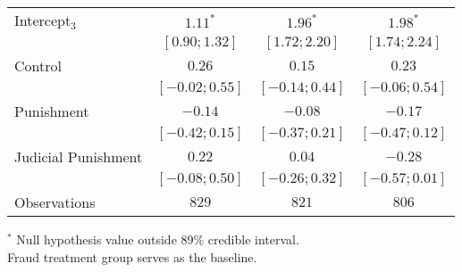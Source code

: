 \begin{table}[h]
\begin{center}
\begin{threeparttable}
\begin{tabular}{l c c c}
Intercept$_3$       & $1.11^{*}$        & $1.96^{*}$        & $1.98^{*}$        \\
                    & $ [ 0.90;  1.32]$ & $ [ 1.72;  2.20]$ & $ [ 1.74;  2.24]$ \\
Control             & $0.26$            & $0.15$            & $0.23$            \\
                    & $ [-0.02;  0.55]$ & $ [-0.14;  0.44]$ & $ [-0.06;  0.54]$ \\
Punishment          & $-0.14$           & $-0.08$           & $-0.17$           \\
                    & $ [-0.42;  0.15]$ & $ [-0.37;  0.21]$ & $ [-0.47;  0.12]$ \\
Judicial Punishment & $0.22$            & $0.04$            & $-0.28$           \\
                    & $ [-0.08;  0.50]$ & $ [-0.26;  0.32]$ & $ [-0.57;  0.01]$ \\
\hline
Observations        & $829$             & $821$             & $806$             \\
\hline
\end{tabular}
\begin{tablenotes}[flushleft]
\scriptsize{$^*$ Null hypothesis value outside 89\% credible interval.  \\
Fraud treatment group serves as the baseline.}
\end{tablenotes}
\end{threeparttable}
\label{table:coefficients}
\end{center}
\end{table}
